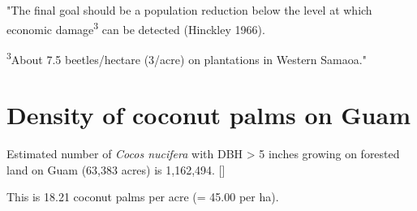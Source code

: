 \documentclass[12pt,letterpaper,english,bibliography=totocnumbered, abstract=on]{scrartcl}
\begin{document}
"The final goal should be a population reduction below the level at which economic damage\textsuperscript{3} can be detected (Hinckley 1966).

\textsuperscript{3}About 7.5 beetles/hectare (3/acre) on plantations in Western Samaoa."

\section{Density of coconut palms on Guam}

Estimated number of \textit{Cocos nucifera} with DBH > 5 inches growing on forested land on Guam (63,383 acres) is 1,162,494. [\cite{donnegon_guams_2004}] 

This is 18.21 coconut palms per acre (=	45.00 per ha).

\newpage
\printbibliography
\end{document}
